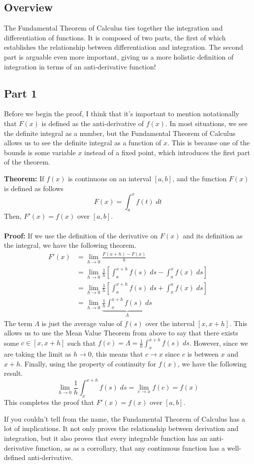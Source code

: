 \subsection{Overview}
The Fundamental Theorem of Calculus ties together the integration and differentiation of functions. 
It is composed of two parts, the first of which establishes the relationship between differentiation and integration. The second part is arguable even more important, giving us a more holistic definition of integration in terms of an anti-derivative function!
\subsection{Part 1}
Before we begin the proof, I think that it's important to mention notationally that $F(x)$ is defined as the anti-derivative of $f(x)$. In most situations, we see the definite integral as a number, but the Fundamental Theorem of Calculus allows us to see the definite integral as a function of $x$. This is because one of the bounds is some variable $x$ instead of a fixed point, which introduces the first part of the theorem.
\begin{boxedsection}
\textbf{Theorem:} If $f(x)$ is continuous on an interval $[a,b]$, and the function $F(x)$ is defined as follows
$$
F(x) = \int_a^x f(t)\;dt
$$
Then, $F'(x) = f(x)$ over $[a,b]$. \\
\\
\textbf{Proof:} If we use the definition of the derivative on $F(x)$ and its definition as the integral, we have the following theorem.
\begin{align*} 
  F'(x) &= \lim_{h\rightarrow 0} \frac{F(x+h) - F(x)}{h}\\
  &= \lim_{h\rightarrow 0} \frac{1}{h} \left[\int_a^{x+h} f(s)\;ds - \int_a^x f(x)\;ds \right]\\
  &= \lim_{h\rightarrow 0} \frac{1}{h} \left[\int_a^{x+h} f(s)\;ds + \int_x^a f(x)\;ds \right]\\
  &= \lim_{h\rightarrow 0} \underbrace{\frac{1}{h} \int_x^{x+h} f(s)\;ds}_{\Lambda}
\end{align*}
The term $\Lambda$ is just the average value of $f(s)$ over the interval $[x,x+h]$. This allows us to use the Mean Value Theorem from above to say that there exists some $c \in [x,x+h]$ such that $f(c) = \Lambda = \frac{1}{h} \int_x^{x+h} f(s)\;ds$.
However, since we are taking the limit as $h \rightarrow 0$, this means that $c \rightarrow x$ since $c$ is between $x$ and $x + h$. Finally, using the property of continuity for $f(x)$, we have the following result.
$$
\lim_{h\rightarrow 0} \frac{1}{h} \int_x^{x+h} f(s)\;ds = \lim_{c \rightarrow x} f(c) = f(x)
$$
This completes the proof that $F'(x) = f(x)$ over $[a,b]$.
\end{boxedsection}
If you couldn't tell from the name, the Fundamental Theorem of Calculus has a lot of implications. It not only proves the relationship between derivation and integration, but it also proves that every integrable function has an anti-derivative function, as as a corrollary, that any continuous function has a well-defined anti-derivative.
